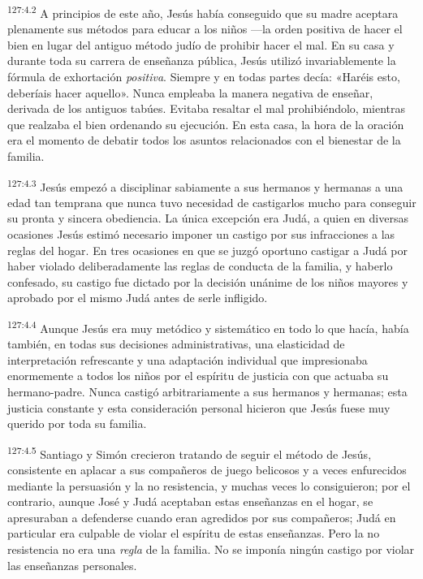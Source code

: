 \par
\textsuperscript{127:4.2} A principios de este año, Jesús había conseguido que su madre aceptara plenamente sus métodos para educar a los niños ---la orden positiva de hacer el bien en lugar del antiguo método judío de prohibir hacer el mal. En su casa y durante toda su carrera de enseñanza pública, Jesús utilizó invariablemente la fórmula de exhortación \textit{positiva}. Siempre y en todas partes decía: «Haréis esto, deberíais hacer aquello». Nunca empleaba la manera negativa de enseñar, derivada de los antiguos tabúes. Evitaba resaltar el mal prohibiéndolo, mientras que realzaba el bien ordenando su ejecución. En esta casa, la hora de la oración era el momento de debatir todos los asuntos relacionados con el bienestar de la familia.

\par
\textsuperscript{127:4.3} Jesús empezó a disciplinar sabiamente a sus hermanos y hermanas a una edad tan temprana que nunca tuvo necesidad de castigarlos mucho para conseguir su pronta y sincera obediencia. La única excepción era Judá, a quien en diversas ocasiones Jesús estimó necesario imponer un castigo por sus infracciones a las reglas del hogar. En tres ocasiones en que se juzgó oportuno castigar a Judá por haber violado deliberadamente las reglas de conducta de la familia, y haberlo confesado, su castigo fue dictado por la decisión unánime de los niños mayores y aprobado por el mismo Judá antes de serle infligido.

\par
\textsuperscript{127:4.4} Aunque Jesús era muy metódico y sistemático en todo lo que hacía, había también, en todas sus decisiones administrativas, una elasticidad de interpretación refrescante y una adaptación individual que impresionaba enormemente a todos los niños por el espíritu de justicia con que actuaba su hermano-padre. Nunca castigó arbitrariamente a sus hermanos y hermanas; esta justicia constante y esta consideración personal hicieron que Jesús fuese muy querido por toda su familia.

\par
\textsuperscript{127:4.5} Santiago y Simón crecieron tratando de seguir el método de Jesús, consistente en aplacar a sus compañeros de juego belicosos y a veces enfurecidos mediante la persuasión y la no resistencia, y muchas veces lo consiguieron; por el contrario, aunque José y Judá aceptaban estas enseñanzas en el hogar, se apresuraban a defenderse cuando eran agredidos por sus compañeros; Judá en particular era culpable de violar el espíritu de estas enseñanzas. Pero la no resistencia no era una \textit{regla} de la familia. No se imponía ningún castigo por violar las enseñanzas personales.

